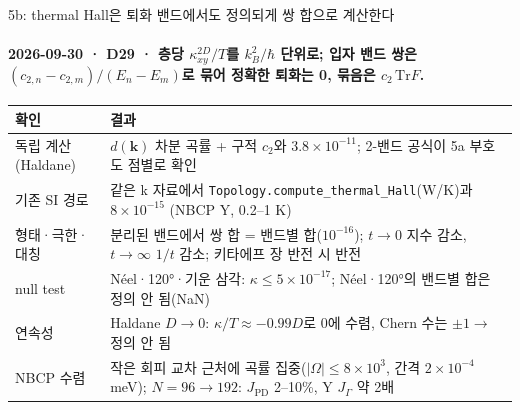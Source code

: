 \begin{frame}[label=stage5b]{5b: thermal Hall은 퇴화 밴드에서도 정의되게 쌍 합으로 계산한다}
  \framesubtitle{2026-09-30 · D29 · 층당 $\kappa_{xy}^{2D}/T$를 $k_B^2/\hbar$ 단위로; 입자 밴드 쌍은 $(c_{2,n}-c_{2,m})/(E_n-E_m)$로 묶어 정확한 퇴화는 0, 묶음은 $c_2\,\mathrm{Tr}F$.}
  \footnotesize\renewcommand{\arraystretch}{1.06}
  \begin{tabularx}{\textwidth}{@{}P{3.2cm}Y@{}}
    \toprule
    확인 & 결과 \\
    \midrule
    독립 계산(Haldane) & $d(\mathbf k)$ 차분 곡률 + 구적 $c_2$와 $3.8\times10^{-11}$; 2-밴드 공식이 5a 부호도 점별로 확인 \\
    기존 SI 경로 & 같은 k 자료에서 \texttt{Topology.compute\_thermal\_Hall}(W/K)과 $8\times10^{-15}$ (NBCP Y, 0.2--1 K) \\
    형태·극한·대칭 & 분리된 밴드에서 쌍 합 = 밴드별 합($10^{-16}$); $t\to0$ 지수 감소, $t\to\infty$ $1/t$ 감소; 키타에프 장 반전 시 반전 \\
    null test & Néel·120°·기운 삼각: $\kappa\le5\times10^{-17}$; Néel·120°의 밴드별 합은 정의 안 됨(NaN) \\
    연속성 & Haldane $D\to0$: $\kappa/T\approx-0.99D$로 0에 수렴, Chern 수는 $\pm1\to$ 정의 안 됨 \\
    NBCP 수렴 & 작은 회피 교차 근처에 곡률 집중($|\Omega|\le8\times10^3$, 간격 $2\times10^{-4}$ meV); $N=96\to192$: $J_{\mathrm{PD}}$ 2--10\%, Y $J_\Gamma$ 약 2배 \\
    \bottomrule
  \end{tabularx}
  \par\smallskip
\end{frame}


